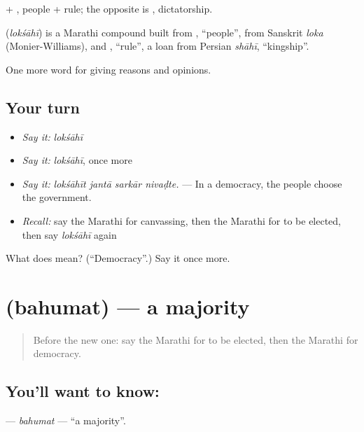  + , people + rule; the opposite is , dictatorship.

\begin{cousinweb}
\textbf{} (\emph{lokśāhī}) is a Marathi compound built from , \textquotedblleft{}people\textquotedblright{}, from Sanskrit \emph{loka} (Monier-Williams), and , \textquotedblleft{}rule\textquotedblright{}, a loan from Persian \emph{shāhī}, \textquotedblleft{}kingship\textquotedblright{}.
\end{cousinweb}

\begin{grammarlens}[title={What you've built}]
One more word for giving reasons and opinions.
\end{grammarlens}

\subsection*{Your turn}
\begin{itemize}
\raggedright
  \item \emph{Say it:} \emph{lokśāhī}
  \item \emph{Say it:} \emph{lokśāhī}, once more
  \item \emph{Say it:} \emph{lokśāhīt jantā sarkār nivaḍte.} — In a democracy, the people choose the government.
  \item \emph{Recall:} say the Marathi for canvassing, then the Marathi for to be elected, then say \emph{lokśāhī} again
\end{itemize}

\begin{tcolorbox}[breakable,colback=teal!4,colframe=teal!35!black,title={Before you move on}]
What does  mean? (\textquotedblleft{}Democracy\textquotedblright{}.) Say it once more.
\end{tcolorbox}
\section[\texorpdfstring{\mr{बहुमत} (bahumat)}{बहुमत (bahumat)}]{ (bahumat) — a majority}

\label{lesson:MR-C356-bahumat}



\begin{quote}
Before the new one: say the Marathi for to be elected, then the Marathi for democracy.
\end{quote}

\subsection*{You'll want to know: }
\textbf{} — \emph{bahumat} — \textquotedblleft{}a majority\textquotedblright{}.

